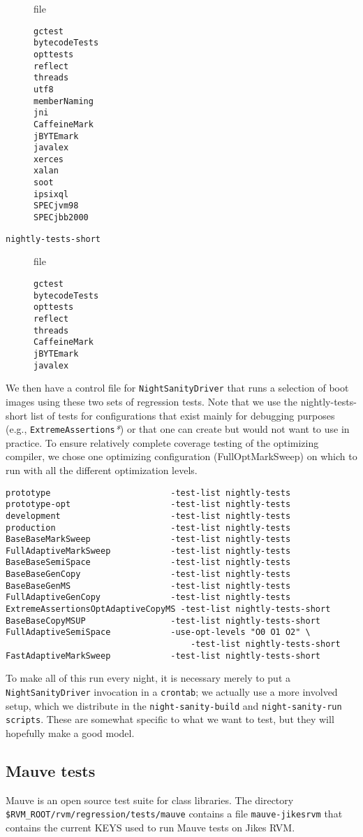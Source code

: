 \begin{description}
\item[] file
\begin{verbatim}
gctest
bytecodeTests
opttests
reflect
threads
utf8
memberNaming
jni
CaffeineMark
jBYTEmark
javalex 
xerces
xalan
soot
ipsixql
SPECjvm98 
SPECjbb2000 
\end{verbatim}
\item[\texttt{nightly-tests-short}] file
\begin{verbatim}
gctest
bytecodeTests
opttests
reflect
threads
CaffeineMark
jBYTEmark
javalex 
\end{verbatim}
\end{description}

 We then have a control file for {\tt{NightSanityDriver}} that runs a
selection of boot images using these two sets of regression tests.
Note that we use the nightly-tests-short list of tests for
configurations that exist mainly for debugging purposes
(e.g., \texttt{ExtremeAssertions}\textit{*}) or that one can
create but would not want to use in practice.
To ensure relatively complete coverage testing of the optimizing
compiler, we chose one optimizing configuration (FullOptMarkSweep) on
which to run with all the different optimization levels.

\begin{verbatim}
prototype                        -test-list nightly-tests
prototype-opt                    -test-list nightly-tests
development                      -test-list nightly-tests
production                       -test-list nightly-tests
BaseBaseMarkSweep                -test-list nightly-tests
FullAdaptiveMarkSweep            -test-list nightly-tests
BaseBaseSemiSpace                -test-list nightly-tests
BaseBaseGenCopy                  -test-list nightly-tests
BaseBaseGenMS                    -test-list nightly-tests
FullAdaptiveGenCopy              -test-list nightly-tests
ExtremeAssertionsOptAdaptiveCopyMS -test-list nightly-tests-short
BaseBaseCopyMSUP                 -test-list nightly-tests-short
FullAdaptiveSemiSpace            -use-opt-levels "O0 O1 O2" \
                                     -test-list nightly-tests-short
FastAdaptiveMarkSweep            -test-list nightly-tests-short
\end{verbatim}

 To make all of this run every night, it is necessary merely to put a
{\tt Night\-San\-i\-ty\-Dri\-ver} invocation in a {\tt crontab}; we actually use a more
involved setup, which we distribute in the {\tt night-sanity-build} and
{\tt night-sanity-run scripts}.  These are somewhat specific to what we want
to test, but they will hopefully make a good model.

\subsection{Mauve tests}
Mauve is an open source test suite for class libraries.  The directory 
{\tt{\$RVM\_\-ROOT/\-rvm/\-re\-gres\-sion/\-tests/\-mauve}} contains a file
{\tt mauve-jikesrvm} that contains the current KEYS used to run Mauve tests
on Jikes RVM. 


